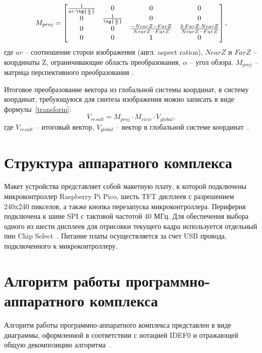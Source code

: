 \begin{equation}
M_{proj} = 
\begin{bmatrix}
    \frac{1}{ar \cdot \tg{\frac{\alpha}{2}}} & 0 & 0 & 0 \\
    0 & \frac{1}{\tg{\frac{\alpha}{2}}} & 0 & 0 \\
    0 & 0 & \frac{-NearZ-FarZ}{NearZ-FarZ} & \frac{2 \cdot FarZ \cdot NearZ}{NearZ-FarZ} \\
    0   &  0  &  1  & 0 \\  
\end{bmatrix},
\end{equation}
где $ar$ -- соотношение сторон изображения (англ. aspect ration), $NearZ$ и $FarZ$ -- координаты Z, ограничивающие область преобразования, $\alpha$ -- угол обзора. $M_{proj}$ -- матрица перспективного преобразования \cite{perspective}. 

Итоговое преобразование вектора из глобальной системы координат, в систему координат, требующуюся для синтеза изображения можно записать в виде формулы~\ref{transform}:
\begin{equation}
V_{result} = M_{proj} \cdot M_{view} \cdot V_{global},
\label{transform}
\end{equation}
где $V_{result}$ -- итоговый вектор, $V_{global}$ -- вектор в глобальной системе координат~\cite{projection}.

\section{Структура аппаратного комплекса}
Макет устройства представляет собой макетную плату, к которой подключены микроконтроллер Raspberry Pi Pico, шесть TFT дисплеев с разрешением 240x240 пикселов, а также кнопка перезапуска микроконтроллера. Периферия подключена к шине SPI с тактовой частотой 40 МГц. Для обеспечения выбора одного из шести дисплеев для отрисовки текущего кадра используется отдельный пин Chip Select~\cite{cs}. Питание платы осуществляется за счет USB провода, подключенного к микроконтроллеру. 

\section{Алгоритм работы программно-аппаратного комплекса}

Алгоритм работы программно-аппаратного комплекса представлен в виде диаграммы, оформленной в
соответствии с нотацией IDEF0 и отражающей общую декомпозицию
алгоритма~\cite{idef0}.

